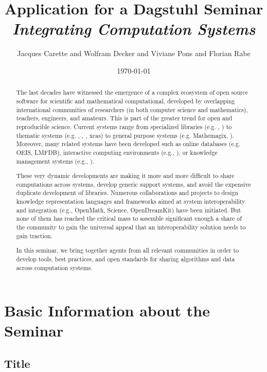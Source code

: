 \documentclass[a4paper,11pt]{article}
\title{Application for a Dagstuhl Seminar \\ \emph{Integrating Computation Systems}}
\author{Jacques Carette and Wolfram Decker and Viviane Pons and Florian Rabe}
\date{\today}
\begin{document}
\maketitle

\begin{abstract}
The last decades have witnessed the emergence of a complex ecosystem of open source software for scientific and mathematical computational, developed by overlapping international communities of researchers (in both computer science and mathematics), teachers, engineers, and amateurs.
This is part of the greater trend for open and reproducible science.
Current systems range from specialized libraries (e.g. \MPIR, \Linbox) to thematic systems (e.g. \GAP, \Pari, \Singular, xcas) to general purpose systems (e.g. Mathemagix, \Sage).
Moreover, many related systems have been developed such as online databases (e.g. OEIS, LMFDB), interactive computing environments (e.g., \Jupyter), or knowledge management systems (e.g., \MathHub).

These very dynamic developments are making it more and more difficult to share computations across systems, develop generic support systems, and avoid the expensive duplicate development of libraries.
Numerous collaborations and projects to design knowledge representation languages and frameworks aimed at system interoperability and integration (e.g., OpenMath, Science, OpenDreamKit) have been initiated.
But none of them has reached the critical mass to assemble significant enough a share of the community to gain the universal appeal that an interoperability solution needs to gain traction.

In this seminar, we bring together agents from all relevant communities in order to develop tools, best practices, and open standards for sharing algorithms and data across computation systems.
\end{abstract}


\tableofcontents

\newpage

\section{Basic Information about the Seminar}

\subsection{Title}
\end{document}
